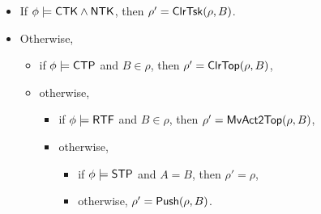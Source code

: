 \begin{itemize}
	\item If $\phi\models{\sf CTK}\wedge{\sf NTK}$, then $\rho' = \mathsf{ClrTsk}(\rho, B)$.
	\item Otherwise,
	\begin{itemize}
		\item if $\phi \models{\sf CTP}$ and $B \in \rho$, then $\rho' =\mathsf{ClrTop}(\rho, B)$,
		\item otherwise,
		\begin{itemize}
			\item if $\phi \models {\sf RTF}$ and $B \in \rho$, then $\rho'=\mathsf{MvAct2Top}(\rho, B)$,
			\item otherwise,
			\begin{itemize}
				\item if $\phi \models {\sf STP}$ and $A = B$, then $\rho' = \rho$,
				\item otherwise, $\rho' = \mathsf{Push}(\rho, B)$.
			\end{itemize}
		\end{itemize}
	\end{itemize}
\end{itemize}

